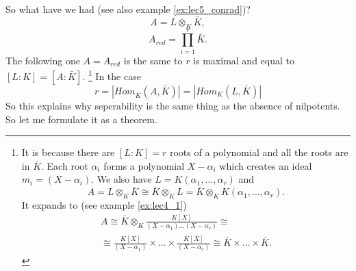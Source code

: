 So what have we had (see also example \ref{ex:lec5_conrad})?
\[
A = L \otimes_K \bar{K},
\]
\begin{equation}
  A_{red} = \prod_{i=1}^r \bar{K}.
  \label{eq:lec5_AredIsProd}
\end{equation}
The following one $A = A_{red}$ is the same to $r$ is maximal and
equal to $\left[L:K\right] = \left[A: \bar{K}\right]$.
\footnote{
  It is because there are $\left[L:K\right] = r$ roots of a
  polynomial and all the roots are in $\bar{K}$. Each root $\alpha_i$
  forms a polynomial $X - \alpha_i$ which creates an ideal $m_i =
  \left(X - \alpha_i\right)$. We also have
  $L = K\left(\alpha_1, \dots, \alpha_r\right)$ and
  \[
  A = L \otimes_K \bar{K} \cong \bar{K} \otimes_K L =
  \bar{K} \otimes_K K\left(\alpha_1, \dots, \alpha_r\right).
  \]
  It expands to (see example \ref{ex:lec4_1})
  \begin{eqnarray}
    A \cong \bar{K} \otimes_K \frac{K\left[X\right]}{(X-\alpha_1)
      \dots (X-\alpha_r)} \cong
    \nonumber \\
    \cong
    \frac{\bar{K}\left[X\right]}{\left(X - \alpha_1\right)}
    \times
    \dots
    \times
    \frac{\bar{K}\left[X\right]}{\left(X - \alpha_r\right)} 
    \cong \bar{K} \times \dots \times \bar{K}.
    \nonumber
  \end{eqnarray}
}
In the case
\[
r = \left|Hom_{\bar{K}}\left(A, \bar{K}\right)\right| = 
\left|Hom_K\left(L, \bar{K}\right)\right|
\]
So this explains why seperability is the same thing as the absence of
nilpotents. So let me formulate it as a theorem.

